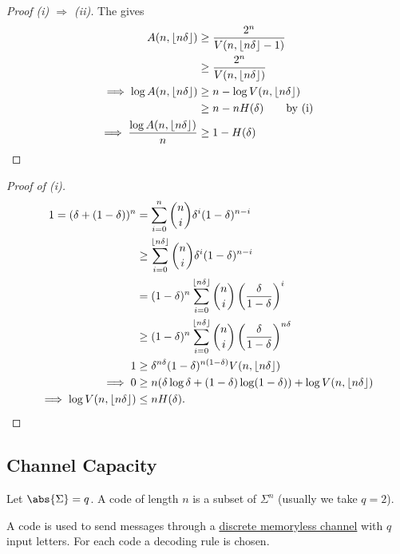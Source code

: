 \documentclass{article}
\DeclarePairedDelimiter{\floor}{\lfloor}{\rfloor}
\newcommand{\1}[1]{\mathbbm{1}_{#1}}
\begin{document}
\begin{proof}[Proof (i) $\Rightarrow$ (ii)]
    The  gives
    \begin{align*}
        A(n, \floor{n \delta}) &\geq \frac{2^n}{V(n, \floor{n \delta} - 1)} \\
                               &\geq \frac{2^n}{V(n, \floor{n \delta})} \\
        \implies \log A(n, \floor{n \delta}) &\geq n - \log V(n, \floor{n \delta})\\
                                             &\geq n - n H(\delta) \qquad \text{by (i)} \\
        \implies \frac{\log A(n, \floor{n\delta})}{n} &\geq 1 - H(\delta) \qedhere
    \end{align*}
\end{proof}
\begin{proof}[Proof of (i)]
    \begin{align*}
        1 = (\delta + (1-\delta))^n &= \sum_{i=0}^n \binom{n}{i}\delta^i (1-\delta)^{n-i} \\
                                    &\geq \sum_{i=0}^{\floor{n \delta}} \binom{n}{i} \delta^i (1 - \delta)^{n-i} \\
                                    &= (1-\delta)^n \sum_{i=0}^{\floor{n\delta}} \binom{n}{i} \left(\frac{\delta}{1 - \delta}\right)^i\\
                                    &\geq (1-\delta)^n \sum_{i = 0}^{\floor{n \delta}} \binom{n}{i} \left(\frac{\delta}{1-\delta}\right)^{n\delta}\\
        1&\geq \delta^{n \delta} (1-\delta)^{n(1-\delta)} V(n, \floor{n\delta}) \\
        \implies 0 &\geq n(\delta \log \delta + (1-\delta) \log (1-\delta)) + \log V(n, \floor{n \delta}) \\
        \implies \log V(n, \floor{n \delta}) &\leq n H(\delta). \qedhere
    \end{align*}
\end{proof}
\subsection{Channel Capacity}
Let $\abs{\Sigma} = q$. A code of length $n$ is a subset of $\Sigma^n$ (usually we take $q=2$).

A code is used to send messages through a \hyperlink{def:dmc}{discrete memoryless channel} with $q$ input letters.
For each code a decoding rule is chosen.
\end{document}
